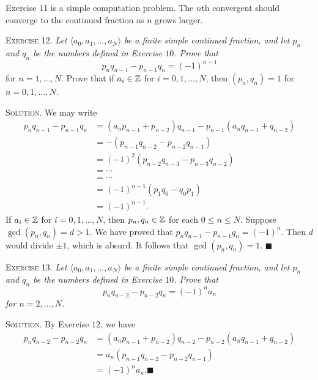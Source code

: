 \documentclass[11pt, leqno]{article}
\newcommand{\done}{\ensuremath{\blacksquare}}
\begin{document}
Exercise 11 is a simple computation problem. The $n$th convergent should converge to the continued fraction as $n$ grows larger.

\textsc{Exercise 12}. \emph{Let $\langle a_0, a_1, \ldots, a_N\rangle$ be a finite simple continued fraction, and let $p_n$ and $q_n$ be the numbers defined in Exercise $10$. Prove that 
\begin{displaymath}
p_nq_{n-1} - p_{n-1}q_n = (-1)^{n-1}
\end{displaymath}}for $n=1,\ldots, N$. Prove that if $a_i \in \mathbb{Z}$ for $i=0,1,\ldots, N$, then $(p_n, q_n) = 1$ for $n=0,1,\ldots, N$.

\textsc{Solution}. We may write 
\begin{align*}
  p_nq_{n-1} - p_{n-1}q_n &= (a_np_{n-1} + p_{n-2})q_{n-1} - p_{n-1}(a_nq_{n-1}+q_{n-2}) \\
                          &= -(p_{n-1}q_{n-2} - p_{n-2}q_{n-1}) \\
                          &= (-1)^2 (p_{n-2}q_{n-3} - p_{n-3}q_{n-2}) \\
                          &= \cdots \\
                          &= \cdots \\
                          &= (-1)^{n-1} (p_1q_0 - q_0p_1) \\
                          &= (-1)^{n-1}.
\end{align*}
If $a_i \in \mathbb{Z}$ for $i = 0, 1, \ldots, N$, then $p_n, q_n \in \mathbb{Z}$ for each $0 \leq n \leq N$. Suppose $\gcd(p_n, q_n) = d > 1$. We have proved that $p_nq_{n-1} - p_{n-1}q_n = (-1)^n$.  Then $d$ would divide $\pm 1$, which is absurd. It follows that $\gcd(p_n, q_n) = 1$. \done

\textsc{Exercise 13}. \emph{Let $\langle a_0, a_1, \ldots, a_N\rangle$ be a finite simple continued fraction, and let $p_n$ and $q_n$ be the numbers defined in Exercise $10$. Prove that 
\begin{displaymath}
p_nq_{n-2} - p_{n-2}q_n = (-1)^n a_n
\end{displaymath}for $n=2,\ldots, N$.}

\textsc{Solution}. By Exercise $12$, we have 
\begin{align*}
  p_nq_{n-2} - p_{n-2}q_n &= (a_np_{n-1}+ p_{n-2})q_{n-2} - p_{n-2}(a_nq_{n-1} + q_{n-2}) \\
                          &= a_n(p_{n-1}q_{n-2} - p_{n-2}q_{n-1})\\
  &= (-1)^n a_n. \done
\end{align*}
\end{document}
